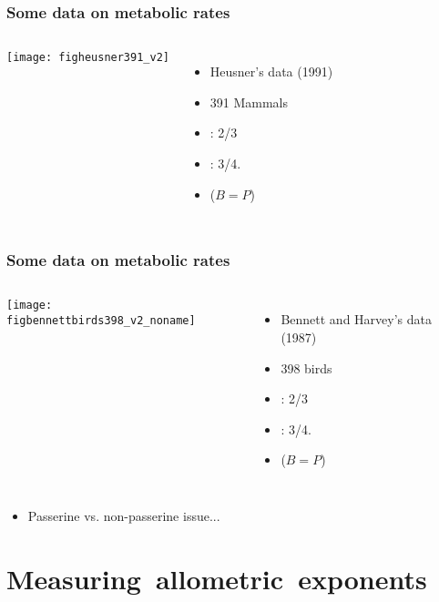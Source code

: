 \begin{frame}
  \frametitle{Some data on metabolic rates}

  \begin{block}{}
  \begin{columns}
    \texttt{[image: figheusner391\_v2]}    
    \begin{itemize}
    \item<1->
      Heusner's data (1991)\cite{heusner1991a}
    \item<1-> 391 Mammals
    \item<1-> : 2/3
    \item<1-> : 3/4.
    \item<1-> ($B = P$)
    \end{itemize}
  \end{columns}
  \end{block}
  
\end{frame}


\begin{frame}
  \frametitle{Some data on metabolic rates}

  \begin{block}{}
  \begin{columns}
    \texttt{[image: figbennettbirds398\_v2\_noname]}
    \begin{itemize}
    \item<1->
      Bennett and Harvey's data (1987)\cite{bennett1987a}
    \item<1-> 398 birds
    \item<1-> : 2/3
    \item<1-> : 3/4.
    \item<1-> ($B = P$)
    \end{itemize}
  \end{columns}

  \begin{itemize}
  \item 
    Passerine vs. non-passerine issue...
  \end{itemize}

  \end{block}

\end{frame}

\section{Measuring\ allometric\ exponents}

